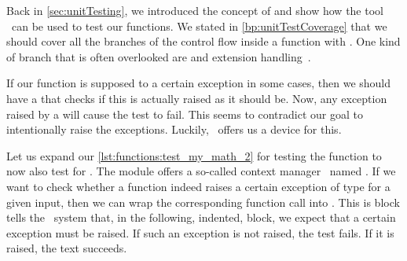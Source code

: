 Back in \cref{sec:unitTesting}, we introduced the concept of  and show how the tool \pytest\ can be used to test our functions.
We stated in \cref{bp:unitTestCoverage} that we should cover all the branches of the control flow inside a function with .
One kind of branch that is often overlooked are  and extension handling~\cite{LRBP2021AEHTPIOSL}.

If our function is supposed to  a certain exception in some cases, then we should have a  that checks if this  is actually raised as it should be.
Now, any exception raised by a  will cause the test to fail.
This seems to contradict our goal to intentionally raise the exceptions.
Luckily, \pytest\ offers us a device for this.

Let us expand our \cref{lst:functions:test_my_math_2} for testing the  function to now also test for .
The  module offers a so-called context manager~\cite{PSF:P3D:TPSL:CUFWSC} named .
If we want to check whether a function indeed raises a certain exception of type  for a given input, then we can wrap the corresponding function call into .
This is block tells the \pytest\ system that, in the following, indented, block, we expect that a certain exception must be raised.
If such an exception is not raised, the test fails.
If it is raised, the text succeeds.

